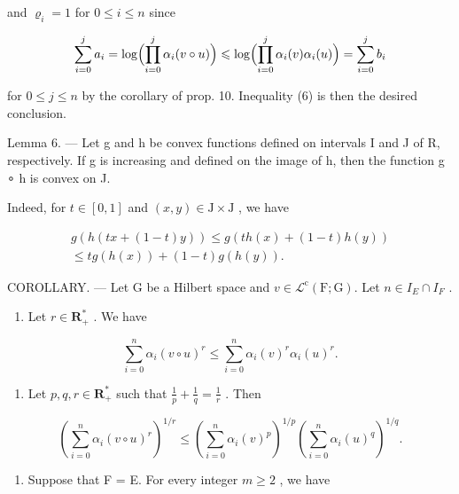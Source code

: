 and \(\varrho_{i} = 1\) for \(0\leqslant i\leqslant n\) since

\[
\sum_ {i = 0} ^ {j} a _ {i} = \log \Bigl (\prod_ {i = 0} ^ {j} \alpha_ {i} (v \circ u) \Bigr) \leqslant \log \Bigl (\prod_ {i = 0} ^ {j} \alpha_ {i} (v) \alpha_ {i} (u) \Bigr) = \sum_ {i = 0} ^ {j} b _ {i}
\]

for \(0 \leqslant j \leqslant n\) by the corollary of prop. 10. Inequality (6) is then the desired conclusion.

Lemma 6. --- Let g and h be convex functions defined on intervals I and J of R, respectively. If g is increasing and defined on the image of h, then the function g ∘ h is convex on J.

Indeed, for \(t \in [0,1]\) and \((x,y) \in \mathrm{J} \times \mathrm{J}\) , we have

\[
\begin{array}{c} g (h (t x + (1 - t) y)) \leqslant g (t h (x) + (1 - t) h (y)) \\ \leqslant t g (h (x)) + (1 - t) g (h (y)). \end{array}
\]

COROLLARY. --- Let G be a Hilbert space and \(v \in \mathcal{L}^{\mathrm{c}}(\mathrm{F};\mathrm{G})\). Let \(n \in I_{E} \cap I_{F}\) .

\begin{enumerate}
\def\labelenumi{\alph{enumi})}
\tightlist
\item
  Let \(r \in \mathbf{R}_{+}^{*}\) . We have
\end{enumerate}

\[
\sum_ {i = 0} ^ {n} \alpha_ {i} (v \circ u) ^ {r} \leqslant \sum_ {i = 0} ^ {n} \alpha_ {i} (v) ^ {r} \alpha_ {i} (u) ^ {r}.
\]

\begin{enumerate}
\def\labelenumi{\alph{enumi})}
\setcounter{enumi}{1}
\tightlist
\item
  Let \(p, q, r \in \mathbf{R}_{+}^{*}\) such that \(\frac{1}{p} + \frac{1}{q} = \frac{1}{r}\) . Then
\end{enumerate}

\[
\left(\sum_ {i = 0} ^ {n} \alpha_ {i} (v \circ u) ^ {r}\right) ^ {1 / r} \leqslant \left(\sum_ {i = 0} ^ {n} \alpha_ {i} (v) ^ {p}\right) ^ {1 / p} \left(\sum_ {i = 0} ^ {n} \alpha_ {i} (u) ^ {q}\right) ^ {1 / q}.
\]

\begin{enumerate}
\def\labelenumi{\alph{enumi})}
\setcounter{enumi}{2}
\tightlist
\item
  Suppose that F = E. For every integer \(m \geqslant 2\) , we have
\end{enumerate}

